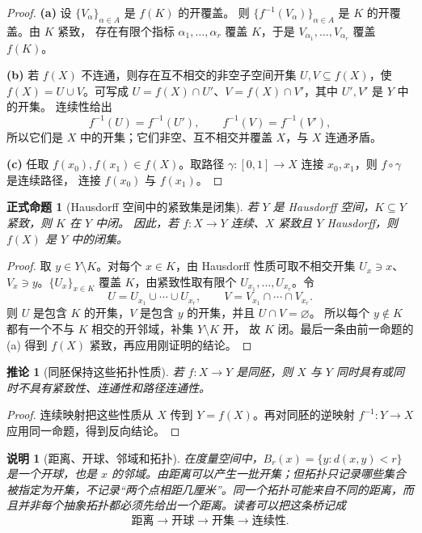 \documentclass[UTF8,fontset=none,a4paper,11pt]{ctexart}
\theoremstyle{foundation-definition}
\theoremstyle{foundation-theorem}
\theoremstyle{foundation-proposition}
\newtheorem{proposition}[definition]{正式命题}
\theoremstyle{foundation-example}
\theoremstyle{foundation-remark}
\newtheorem{remark}[definition]{说明}
\theoremstyle{foundation-theorem}
\newtheorem{corollary}[definition]{推论}
\begin{document}
\begin{proof}
\textbf{(a)} 设 \(\{V_\alpha\}_{\alpha\in A}\) 是 \(f(K)\) 的开覆盖。
则 \(\{f^{-1}(V_\alpha)\}_{\alpha\in A}\) 是 \(K\) 的开覆盖。由 \(K\) 紧致，
存在有限个指标 \(\alpha_1,\ldots,\alpha_r\) 覆盖 \(K\)，于是
\(V_{\alpha_1},\ldots,V_{\alpha_r}\) 覆盖 \(f(K)\)。

\textbf{(b)} 若 \(f(X)\) 不连通，则存在互不相交的非空子空间开集
\(U,V\subseteq f(X)\)，使 \(f(X)=U\cup V\)。可写成
\(U=f(X)\cap U'\)、\(V=f(X)\cap V'\)，其中 \(U',V'\) 是 \(Y\) 中的开集。
连续性给出
\[
f^{-1}(U)=f^{-1}(U'),\qquad f^{-1}(V)=f^{-1}(V'),
\]
所以它们是 \(X\) 中的开集；它们非空、互不相交并覆盖 \(X\)，与 \(X\) 连通矛盾。

\textbf{(c)} 任取 \(f(x_0),f(x_1)\in f(X)\)。取路径
\(\gamma:[0,1]\to X\) 连接 \(x_0,x_1\)，则 \(f\circ\gamma\) 是连续路径，
连接 \(f(x_0)\) 与 \(f(x_1)\)。\end{proof}

\begin{proposition}[Hausdorff 空间中的紧致集是闭集]\label{prop:compact-closed-hausdorff}
若 \(Y\) 是 Hausdorff 空间，\(K\subseteq Y\) 紧致，则 \(K\) 在 \(Y\) 中闭。
因此，若 \(f:X\to Y\) 连续、\(X\) 紧致且 \(Y\) Hausdorff，则 \(f(X)\) 是 \(Y\) 中的闭集。
\end{proposition}

\begin{proof}
取 \(y\in Y\setminus K\)。对每个 \(x\in K\)，由 Hausdorff 性质可取不相交开集
\(U_x\ni x\)、\(V_x\ni y\)。\(\{U_x\}_{x\in K}\) 覆盖 \(K\)，由紧致性取有限个
\(U_{x_1},\ldots,U_{x_r}\)。令
\[
U=U_{x_1}\cup\cdots\cup U_{x_r},\qquad
V=V_{x_1}\cap\cdots\cap V_{x_r}.
\]
则 \(U\) 是包含 \(K\) 的开集，\(V\) 是包含 \(y\) 的开集，并且 \(U\cap V=\varnothing\)。
所以每个 \(y\notin K\) 都有一个不与 \(K\) 相交的开邻域，补集 \(Y\setminus K\) 开，
故 \(K\) 闭。最后一条由前一命题的 (a) 得到 \(f(X)\) 紧致，再应用刚证明的结论。\end{proof}

\begin{corollary}[同胚保持这些拓扑性质]\label{cor:homeomorphism-invariants-basic}
若 \(f:X\to Y\) 是同胚，则 \(X\) 与 \(Y\) 同时具有或同时不具有紧致性、连通性和路径连通性。
\end{corollary}

\begin{proof}
连续映射把这些性质从 \(X\) 传到 \(Y=f(X)\)。再对同胚的逆映射
\(f^{-1}:Y\to X\) 应用同一命题，得到反向结论。\end{proof}

\begin{remark}[距离、开球、邻域和拓扑]
在度量空间中，\(B_r(x)=\{y:d(x,y)<r\}\) 是一个开球，也是 \(x\) 的邻域。由距离可以产生一批开集；但拓扑只记录哪些集合被指定为开集，不记录“两个点相距几厘米”。同一个拓扑可能来自不同的距离，而且并非每个抽象拓扑都必须先给出一个距离。读者可以把这条桥记成
\[
\text{距离}\longrightarrow\text{开球}\longrightarrow\text{开集}\longrightarrow\text{连续性}.
\]
\end{remark}
\end{document}
